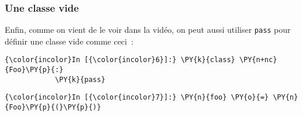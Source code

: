     \hypertarget{une-classe-vide}{%
\subsubsection{Une classe vide}\label{une-classe-vide}}

    Enfin, comme on vient de le voir dans la vidéo, on peut aussi utiliser
\texttt{pass} pour définir une classe vide comme ceci~:

    \begin{Verbatim}[commandchars=\\\{\}]
{\color{incolor}In [{\color{incolor}6}]:} \PY{k}{class} \PY{n+nc}{Foo}\PY{p}{:}
            \PY{k}{pass}
\end{Verbatim}


    \begin{Verbatim}[commandchars=\\\{\}]
{\color{incolor}In [{\color{incolor}7}]:} \PY{n}{foo} \PY{o}{=} \PY{n}{Foo}\PY{p}{(}\PY{p}{)}
\end{Verbatim}



    
    
    
